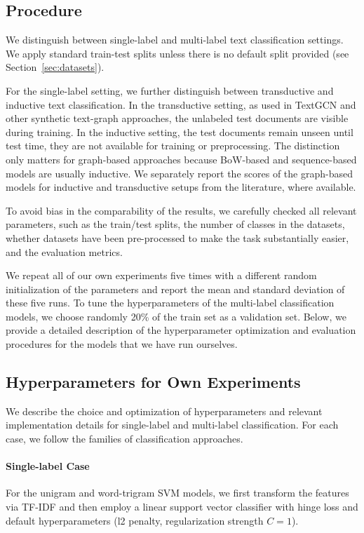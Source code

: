 \documentclass[acmsmall,nonacm]{acmart}
\begin{document}
\subsection{Procedure}

We distinguish between single-label and multi-label text classification settings.
We apply standard train-test splits unless there is no default split provided (see Section~\ref{sec:datasets}).

For the single-label setting, we further distinguish between transductive and inductive text classification.
In the transductive setting, as used in TextGCN and other synthetic text-graph approaches, the unlabeled test documents are visible during training.  In the inductive setting, the test documents remain unseen until test time, \ie they are not available for training or preprocessing. The distinction only matters for graph-based approaches because BoW-based and sequence-based models are usually inductive.
We separately report the scores of the graph-based models for inductive and transductive setups from the literature, where available.

To avoid bias in the comparability of the results, we carefully checked all relevant parameters, such as the train/test splits, the number of classes in the datasets, whether datasets have been pre-processed to make the task substantially easier, and the evaluation metrics. 

We repeat all of our own experiments five times with a different random initialization of the parameters and report the mean and standard deviation of these five runs.
To tune the hyperparameters of the multi-label classification models, we choose randomly 20\% of the train set as a validation set. 
Below, we provide a detailed description of the hyperparameter optimization and evaluation procedures for the models that we have run ourselves.

\subsection{Hyperparameters for Own Experiments}

We describe the choice and optimization of hyperparameters and relevant implementation details for single-label and multi-label classification.
For each case, we follow the families of classification approaches.

\paragraph{Single-label Case}
For the unigram and word-trigram SVM models, we first transform the features via TF-IDF and then employ a linear support vector classifier with hinge loss and default hyperparameters (l2 penalty, regularization strength $C=1$).
\end{document}
